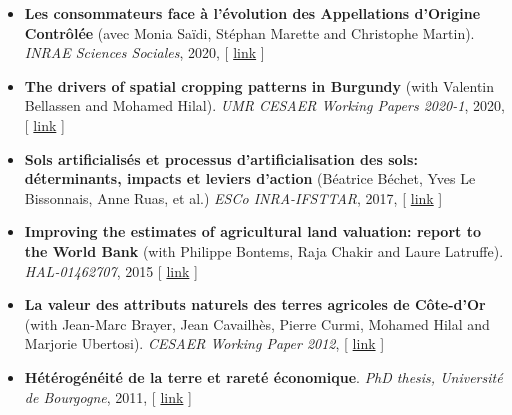 \documentclass[11pt, a4paper]{./style}
\begin{document}
\label{sec:org03c7f39}

\begin{itemize}
\item \textbf{Les consommateurs face à l’évolution des Appellations d’Origine
Contrôlée} (avec Monia Saïdi, Stéphan Marette and Christophe
Martin). \emph{INRAE Sciences Sociales}, 2020, [ \href{https://ageconsearch.umn.edu/record/305806}{link} ]
\item \textbf{The drivers of spatial cropping patterns in Burgundy} (with
Valentin Bellassen and Mohamed Hilal). \emph{UMR CESAER Working Papers
2020-1}, 2020, [ \href{https://hal.inrae.fr/hal-02894116}{link} ]
\item \textbf{Sols artificialisés et processus d'artificialisation des sols:
déterminants, impacts et leviers d'action} (Béatrice Béchet, Yves
Le Bissonnais, Anne Ruas, et al.) \emph{ESCo INRA-IFSTTAR}, 2017, [
\href{https://www.inrae.fr/actualites/sols-artificialises-processus-dartificialisation-sols}{link} ]
\item \textbf{Improving the estimates of agricultural land valuation: report
to the World Bank} (with Philippe Bontems, Raja Chakir and Laure
Latruffe). \emph{HAL-01462707}, 2015 [ \href{https://hal.archives-ouvertes.fr/hal-01462707}{link} ]
\item \textbf{La valeur des attributs naturels des terres agricoles de
Côte-d'Or} (with Jean-Marc Brayer, Jean Cavailhès, Pierre Curmi,
Mohamed Hilal and Marjorie Ubertosi). \emph{CESAER Working Paper
2012}, [ \href{http://ideas.repec.org/p/ceo/wpaper/33.html}{link} ]
\item \textbf{Hétérogénéité de la terre et rareté économique}. \emph{PhD thesis,
Université de Bourgogne}, 2011, [ \href{http://tel.archives-ouvertes.fr/tel-00629142/en/}{link} ]
\end{itemize}

\label{sec:org53b02da}
\end{document}
